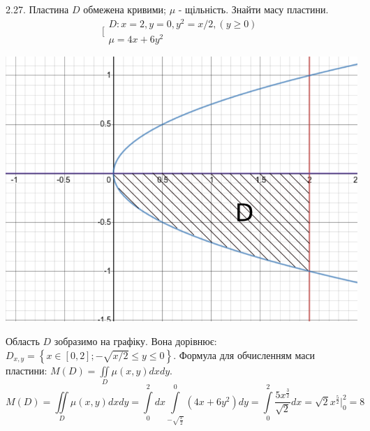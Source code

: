 \documentclass[14pt,a4paper]{scrartcl}
\theoremstyle{definition}
\theoremstyle{remark}
\theoremstyle{definition}
\theoremstyle{definition}
\begin{document}
2.27. Пластина $D$ обмежена кривими; $\mu$ - щільність. Знайти масу пластини.
$$
\Bigg[
\begin{gathered}
 D: x = 2, y=0, y^2 = x/2, (y\geq 0)\\
 \mu = 4x + 6y^2
\end{gathered}
$$
\begin{center} \includegraphics[scale=0.5]{2.png} \end{center}
Область $D$ зобразимо на графіку.
Вона дорівнює:
$D_{x,y}= \left\lbrace x \in[0,2] ; -\sqrt{x/2} \leq y\leq 0 \right\rbrace $.
Формула для обчисленням маси пластини: $ M(D) =  \iint\limits_{D}^{}{\mu(x,y )dx dy}$.
$$
M(D) =  \iint\limits_{D}^{}{\mu(x,y )dx dy} =  \int\limits_{0}^{2}{dx \int\limits_{- \sqrt{	\frac{x}{2} 	}}^{ 0}{(4x+6y^2) dy}}=  \int\limits_{0}^{2}{
\dfrac{5x^\frac{3}{2}}{\sqrt{2}}dx
} =\sqrt{2}x^\frac{5}{2} \Bigg|_{0}^2= 8
$$

\pagebreak
\end{document}
